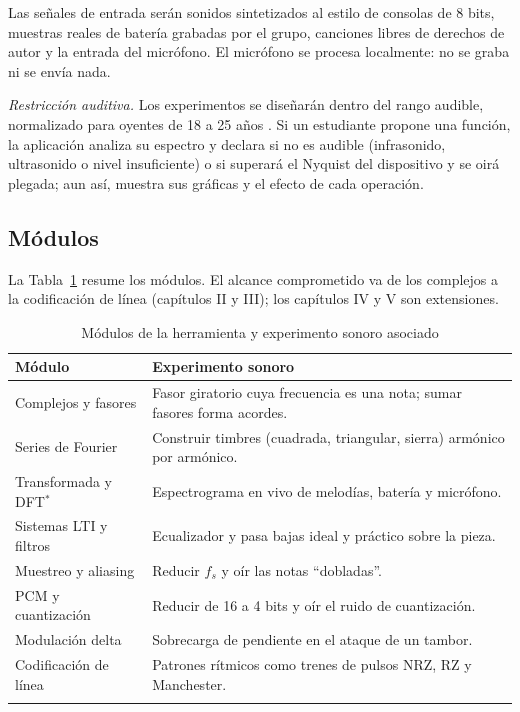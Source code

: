 \documentclass[conference]{IEEEtran}
\begin{document}
Las señales de entrada serán sonidos sintetizados al estilo de consolas de 8 bits, muestras reales de batería grabadas por el grupo, canciones libres de derechos de autor y la entrada del micrófono. El micrófono se procesa localmente: no se graba ni se envía nada.

\emph{Restricción auditiva.} Los experimentos se diseñarán dentro del rango audible, normalizado para oyentes de 18 a 25 años \citep{iso226,suzuki2004}. Si un estudiante propone una función, la aplicación analiza su espectro y declara si no es audible (infrasonido, ultrasonido o nivel insuficiente) o si superará el Nyquist del dispositivo y se oirá plegada; aun así, muestra sus gráficas y el efecto de cada operación.

\subsection{Módulos}
La Tabla~\ref{tab:modulos} resume los módulos. El alcance comprometido va de los complejos a la codificación de línea (capítulos II y III); los capítulos IV y V son extensiones.

\begin{table}[!t]
\caption{Módulos de la herramienta y experimento sonoro asociado}
\label{tab:modulos}
\centering
\footnotesize
\begin{tabular}{@{}>{\raggedright\arraybackslash}p{}>{\raggedright\arraybackslash}p{}@{}}
\toprule
\textbf{Módulo} & \textbf{Experimento sonoro} \\
\midrule
Complejos y fasores & Fasor giratorio cuya frecuencia es una nota; sumar fasores forma acordes. \\
Series de Fourier & Construir timbres (cuadrada, triangular, sierra) armónico por armónico. \\
Transformada y DFT$^\ast$ & Espectrograma en vivo de melodías, batería y micrófono. \\
Sistemas LTI y filtros & Ecualizador y pasa bajas ideal y práctico sobre la pieza. \\
Muestreo y aliasing & Reducir $f_s$ y oír las notas ``dobladas''. \\
PCM y cuantización & Reducir de 16 a 4 bits y oír el ruido de cuantización. \\
Modulación delta & Sobrecarga de pendiente en el ataque de un tambor. \\
Codificación de línea & Patrones rítmicos como trenes de pulsos NRZ, RZ y Manchester. \\
\bottomrule
\multicolumn{2}{@{}l}{\scriptsize $^\ast$Módulo central de la demostración.}
\end{tabular}
\end{table}
\end{document}
